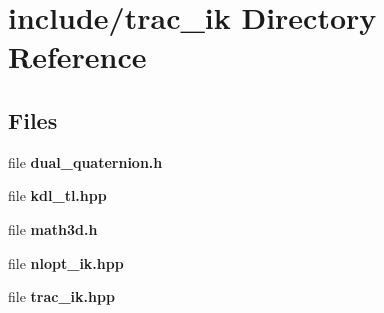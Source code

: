 \section{include/trac\-\_\-ik Directory Reference}
\label{dir_39302c000dfed0d573dae27cdd1106a2}
\subsection*{Files}
\begin{DoxyCompactItemize}
\item 
file {\bfseries dual\-\_\-quaternion.\-h}
\item 
file {\bfseries kdl\-\_\-tl.\-hpp}
\item 
file {\bfseries math3d.\-h}
\item 
file {\bfseries nlopt\-\_\-ik.\-hpp}
\item 
file {\bfseries trac\-\_\-ik.\-hpp}
\end{DoxyCompactItemize}
